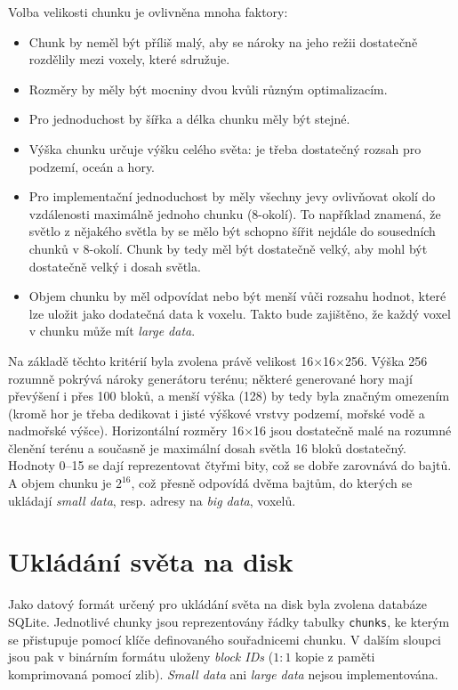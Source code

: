 Volba velikosti chunku je ovlivněna mnoha faktory:
\begin{itemize}
	\item Chunk by neměl být příliš malý, aby se nároky na jeho režii dostatečně rozdělily mezi voxely, které sdružuje.
	\item Rozměry by měly být mocniny dvou kvůli různým optimalizacím.
	\item Pro jednoduchost by šířka a délka chunku měly být stejné.
	\item Výška chunku určuje výšku celého světa: je třeba dostatečný rozsah pro podzemí, oceán a hory.
	\item Pro implementační jednoduchost by měly všechny jevy ovlivňovat okolí do vzdálenosti maximálně jednoho chunku (8-okolí). To například znamená, že světlo z nějakého světla by se mělo být schopno šířit nejdále do sousedních chunků v 8-okolí. Chunk by tedy měl být dostatečně velký, aby mohl být dostatečně velký i dosah světla.
	\item Objem chunku by měl odpovídat nebo být menší vůči rozsahu hodnot, které lze uložit jako dodatečná data k voxelu. Takto bude zajištěno, že každý voxel v chunku může mít \textit{large data}.
\end{itemize}

Na základě těchto kritérií byla zvolena právě velikost 16×16×256. Výška 256 rozumně pokrývá nároky generátoru terénu; některé generované hory mají převýšení i přes 100 bloků, a menší výška (128) by tedy byla značným omezením (kromě hor je třeba dedikovat i jisté výškové vrstvy podzemí, mořské vodě a nadmořské výšce). Horizontální rozměry 16×16 jsou dostatečně malé na rozumné členění terénu a současně je maximální dosah světla 16 bloků dostatečný. Hodnoty 0--15 se dají reprezentovat čtyřmi bity, což se dobře zarovnává do bajtů. A objem chunku je $2^{16}$, což přesně odpovídá dvěma bajtům, do kterých se ukládají \textit{small data}, resp. adresy na \textit{big data}, voxelů.

\section{Ukládání světa na disk}
Jako datový formát určený pro ukládání světa na disk byla zvolena databáze SQLite. Jednotlivé chunky jsou reprezentovány řádky tabulky \verb|chunks|, ke kterým se přistupuje pomocí klíče definovaného souřadnicemi chunku. V dalším sloupci jsou pak v binárním formátu uloženy \textit{block IDs} ($1:1$ kopie z paměti komprimovaná pomocí zlib). \textit{Small data} ani \textit{large data} nejsou implementována.

